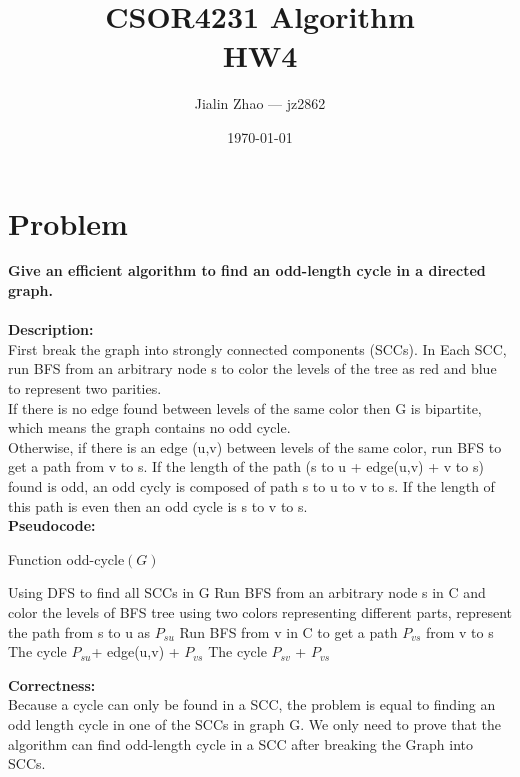 \documentclass{article}
\title{CSOR4231 Algorithm\\HW4}
\author{Jialin Zhao --- jz2862}
\date{\today}
\begin{document}
 
\maketitle{} 
\section{Problem \uppercase\expandafter{}} 
\textbf{Give an efficient algorithm to find an odd-length cycle in a directed graph.\\\\}
\textbf{\large Description:\\}
First break the graph into strongly connected components (SCCs). In Each SCC, run BFS from an arbitrary node s to color the levels of the tree as red and blue to represent two parities. \\
If there is no edge found between levels of the same color then G is bipartite, which means the graph contains no odd cycle.\\
Otherwise, if there is an edge (u,v) between levels of the same color, run BFS to get a path from v to s.
If the length of the path (s to u + edge(u,v) + v to s) found is odd, an odd cycly is composed of path s to u to v to s. If the length of this path is even then an odd cycle is s to v to s.\\
\textbf{\large Pseudocode:\\}
\begin{algorithm}[H]
  \caption{Function odd-cycle$(G)$}
  \label{alg1}
  \begin{algorithmic}
  \STATE Using DFS to find all SCCs in G 
  \STATE Run BFS from an arbitrary node s in C and color the levels of BFS tree using two colors representing different parts, represent the path from s to u as $P_{su}$
  \STATE Run BFS from v in C to get a path $P_{vs}$ from v to s 
  \RETURN The cycle $P_{su}$+ edge(u,v) + $P_{vs}$ 
  \ELSE
  \RETURN The cycle $P_{sv}$ + $P_{vs}$ 
  \ENDIF
  \ENDIF
  \ENDFOR
  \end{algorithmic}
\end{algorithm}
\noindent\textbf{\large Correctness:\\}
Because a cycle can only be found in a SCC, the problem is equal to finding an odd length cycle in one of the SCCs in graph G. We only need to prove that the algorithm can find odd-length cycle in a SCC after breaking the Graph into SCCs.\\
\end{document}

